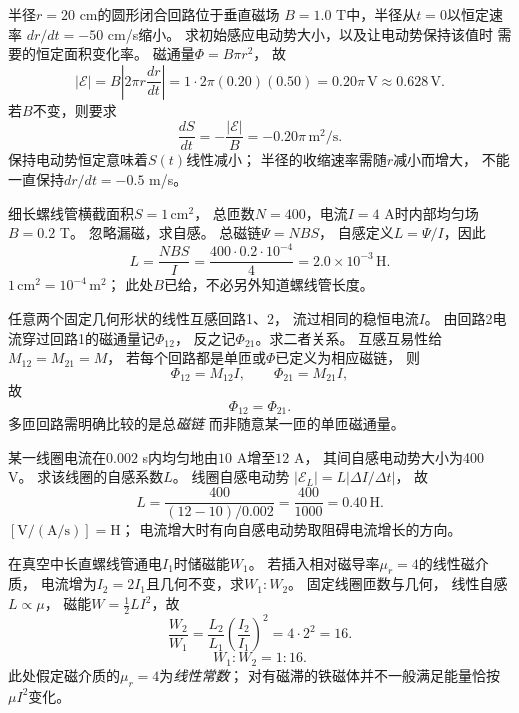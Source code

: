 \problemtext 半径$r=20$ cm的圆形闭合回路位于垂直磁场
$B=1.0$ T中，半径从$t=0$以恒定速率
$dr/dt=-50$ cm/s缩小。
求初始感应电动势大小，以及让电动势保持该值时
需要的恒定面积变化率。
\workings
磁通量$\Phi=B\pi r^2$，
故
\[
|\mathcal E|=B\left|2\pi r\frac{dr}{dt}\right|
=1\cdot2\pi(0.20)(0.50)
=\boxed{0.20\pi\,\mathrm V\approx0.628\,\mathrm V}.
\]
若$B$不变，则要求
\[
\boxed{\frac{dS}{dt}=-\frac{|\mathcal E|}{B}
=-0.20\pi\,\mathrm{m^2/s}}.
\]
\crosscheck 保持电动势恒定意味着$S(t)$线性减小；
半径的收缩速率需随$r$减小而增大，
不能一直保持$dr/dt=-0.5$ m/s。

\problemtext 细长螺线管横截面积$S=1\,\mathrm{cm^2}$，
总匝数$N=400$，电流$I=4$ A时内部均匀场$B=0.2$ T。
忽略漏磁，求自感。
\workings
总磁链$\Psi=NB S$，
自感定义$L=\Psi/I$，因此
\[
\boxed{L=\frac{NBS}{I}
=\frac{400\cdot0.2\cdot10^{-4}}4
=2.0\times10^{-3}\,\mathrm H}.
\]
\crosscheck $1\,\mathrm{cm^2}=10^{-4}\,\mathrm{m^2}$；
此处$B$已给，不必另外知道螺线管长度。

\problemtext 任意两个固定几何形状的线性互感回路1、2，
流过相同的稳恒电流$I$。
由回路2电流穿过回路1的磁通量记$\Phi_{12}$，
反之记$\Phi_{21}$。求二者关系。
\workings
互感互易性给
$M_{12}=M_{21}=M$，
若每个回路都是单匝或$\Phi$已定义为相应磁链，
则
\[
\Phi_{12}=M_{12}I,\qquad
\Phi_{21}=M_{21}I,
\]
故
\[
\boxed{\Phi_{12}=\Phi_{21}}.
\]
\crosscheck 多匝回路需明确比较的是总\emph{磁链}
而非随意某一匝的单匝磁通量。

\problemtext 某一线圈电流在$0.002$ s内均匀地由$10$ A增至$12$ A，
其间自感电动势大小为400 V。
求该线圈的自感系数$L$。
\workings
线圈自感电动势
$|\mathcal E_L|=L|\Delta I/\Delta t|$，
故
\[
\boxed{L=\frac{400}{(12-10)/0.002}
=\frac{400}{1000}=0.40\,\mathrm H}.
\]
\crosscheck $[\mathrm V/(\mathrm{A/s})]=\mathrm H$；
电流增大时有向自感电动势取阻碍电流增长的方向。

\problemtext 在真空中长直螺线管通电$I_1$时储磁能$W_1$。
若插入相对磁导率$\mu_r=4$的线性磁介质，
电流增为$I_2=2I_1$且几何不变，求$W_1:W_2$。
\workings
固定线圈匝数与几何，
线性自感$L\propto\mu$，
磁能$W=\tfrac12LI^2$，故
\[
\frac{W_2}{W_1}
=\frac{L_2}{L_1}\left(\frac{I_2}{I_1}\right)^2
=4\cdot2^2=16.
\]
\[
\boxed{W_1:W_2=1:16}.
\]
\crosscheck 此处假定磁介质的$\mu_r=4$为\emph{线性常数}；
对有磁滞的铁磁体并不一般满足能量恰按$\mu I^2$变化。
